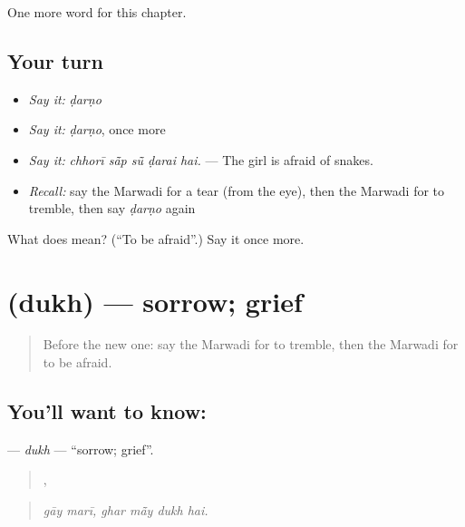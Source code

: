 \begin{grammarlens}[title={What you've built}]
One more word for this chapter.
\end{grammarlens}

\subsection*{Your turn}
\begin{itemize}
\raggedright
  \item \emph{Say it:} \emph{ḍarṇo}
  \item \emph{Say it:} \emph{ḍarṇo}, once more
  \item \emph{Say it:} \emph{chhorī sā̃p sū̃ ḍarai hai.} — The girl is afraid of snakes.
  \item \emph{Recall:} say the Marwadi for a tear (from the eye), then the Marwadi for to tremble, then say \emph{ḍarṇo} again
\end{itemize}

\begin{tcolorbox}[breakable,colback=teal!4,colframe=teal!35!black,title={Before you move on}]
What does  mean? (\textquotedblleft{}To be afraid\textquotedblright{}.) Say it once more.
\end{tcolorbox}
\section[\texorpdfstring{\mw{दुख} (dukh)}{दुख (dukh)}]{ (dukh) — sorrow; grief}

\label{lesson:MW-C256-dukh}



\begin{quote}
Before the new one: say the Marwadi for to tremble, then the Marwadi for to be afraid.
\end{quote}

\subsection*{You'll want to know: }
\textbf{} — \emph{dukh} — \textquotedblleft{}sorrow; grief\textquotedblright{}.

\begin{quote}
 ,    
\end{quote}

\begin{quote}
\emph{gāy marī, ghar mā̃y dukh hai.}
\end{quote}


